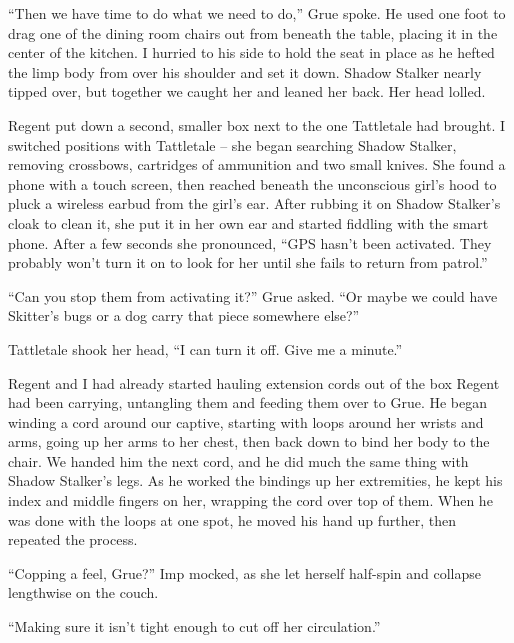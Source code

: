 ``Then we have time to do what we need to do,'' Grue spoke.  He used one foot to drag one of the dining room chairs out from beneath the table, placing it in the center of the kitchen.  I hurried to his side to hold the seat in place as he hefted the limp body from over his shoulder and set it down.  Shadow Stalker nearly tipped over, but together we caught her and leaned her back.  Her head lolled.



Regent put down a second, smaller box next to the one Tattletale had brought.  I switched positions with Tattletale – she began searching Shadow Stalker, removing crossbows, cartridges of ammunition and two small knives.  She found a phone with a touch screen, then reached beneath the unconscious girl's hood to pluck a wireless earbud from the girl's ear.  After rubbing it on Shadow Stalker's cloak to clean it, she put it in her own ear and started fiddling with the smart phone.  After a few seconds she pronounced, ``GPS hasn't been activated.  They probably won't turn it on to look for her until she fails to return from patrol.''



``Can you stop them from activating it?''  Grue asked.  ``Or maybe we could have Skitter's bugs or a dog carry that piece somewhere else?''



Tattletale shook her head, ``I can turn it off.  Give me a minute.''



Regent and I had already started hauling extension cords out of the box Regent had been carrying, untangling them and feeding them over to Grue.  He began winding a cord around our captive, starting with loops around her wrists and arms, going up her arms to her chest, then back down to bind her body to the chair.  We handed him the next cord, and he did much the same thing with Shadow Stalker's legs.  As he worked the bindings up her extremities, he kept his index and middle fingers on her, wrapping the cord over top of them.  When he was done with the loops at one spot, he moved his hand up further, then repeated the process.



``Copping a feel, Grue?'' Imp mocked, as she let herself half-spin and collapse lengthwise on the couch.



``Making sure it isn't tight enough to cut off her circulation.''



